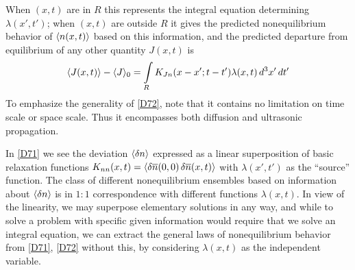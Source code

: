 When $(x, t)$ are in $R$ this represents the integral equation determining $\lambda(x', t')$; when $(x, t)$ are outside $R$ it gives the predicted nonequilibrium behavior of $\langle n(x, t)\rangle$ based on this information, and the predicted departure from equilibrium of any other quantity $J(x,t)$ is
\begin{equation}
	\label{D72}
	\langle J(x,t)\rangle - \langle J\rangle_0 = \int\limits_{R} K_{Jn}(x - x'; t - t') \lambda(x, t)\mathop{}\!d^3 x' \mathop{}\!d t'
\end{equation}
To emphasize the generality of \eqref{D72}, note that it contains no limitation on time scale or space scale.
Thus it encompasses both diffusion and ultrasonic propagation.

In \eqref{D71} we see the deviation $\langle\mathop{}\!\delta n\rangle$ expressed as a linear superposition of basic relaxation functions $K_{nn}(x, t) = \langle\mathop{}\!\delta \overline{n}(0, 0) \mathop{}\!\delta \overline{n}(x, t)\rangle$ with $\lambda(x', t')$ as the 	``source'' function.
The class of different nonequilibrium ensembles based on information about $\langle\mathop{}\!\delta n\rangle$ is in $1:1$ correspondence with different functions $\lambda(x, t)$.
In view of the linearity, we may superpose elementary solutions in any way, and while to solve a problem with specific given information would require that we solve an integral equation, we can extract the general laws of nonequilibrium behavior from \eqref{D71}, \eqref{D72} without this, by considering $\lambda(x, t)$ as the independent variable.

